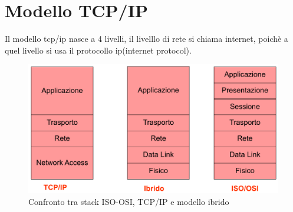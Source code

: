     \newpage
\section{Modello TCP/IP}
Il modello tcp/ip nasce a 4 livelli, il livelllo di rete si chiama internet, poichè a quel livello si usa il protocollo ip(internet protocol).





\begin{figure}[h!]
    \centering
    \includegraphics[width=1\textwidth]{images/confronto_stack.png}
    \caption{Confronto tra stack ISO-OSI, TCP/IP e modello ibrido}
    \label{fig:confronto_stack}
\end{figure}